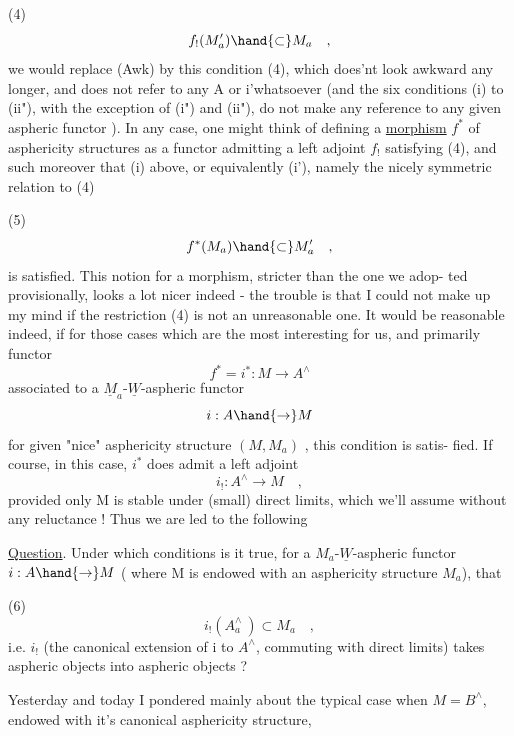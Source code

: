 
(4) \[ f_{!}(M'_a) \hand{\subset} M_a \quad , \]
we would replace (Awk) by this condition (4), which does'nt look awkward
any longer, and does not refer to any A or i'whatsoever (and 
the  six conditions (i) to (ii"), with the exception of (i")
and (ii"), do not make any reference to any given aspheric functor ).
In any case, one might think of defining a \uline{morphism} $f^*$ of asphericity
structures as a functor admitting a left adjoint $f_{!}$ satisfying (4), and
such moreover that (i) above, or equivalently (i'), namely the nicely
symmetric relation to (4)

(5) \[ f^*(M_a) \hand{\subset} M'_a \quad , \]
is satisfied. This notion for a morphism, stricter than the one we adop-%
ted provisionally, looks a lot nicer indeed - the trouble is that I
could not make up my mind if the restriction (4) is not  an unreasonable
one. It would be reasonable indeed, if for those cases which are the most
interesting for us, and primarily  functor
\[ f^* = i^* : M \longrightarrow A^{\wedge} \]
associated to a $\underline{M}_a$-$\underline{W}$-aspheric functor
\[ i: A \hand{\to} M \]
for   given "nice" asphericity structure $(M,M_a)$ , this condition is satis-%
fied. If course, in this case, $i^*$ does admit a left adjoint
\[ i_{!} : A^{\wedge} \longrightarrow M \quad , \]
provided only M is stable under (small) direct limits, which we'll assume
without any reluctance ! Thus we are led to the following

\uline{Question}. Under which conditions is it true, for a $M_a$-$\underline{W}$-aspheric
functor $i: A \hand{\to} M$ ( where M is endowed with an asphericity structure $M_a$),
that

(6) \[ i_{!}(A^{\wedge}_a \ ) \subset M_a \quad , \]
i.e. $i_{!}$ (the canonical extension of i to $A^{\wedge}$, commuting with direct
limits) takes aspheric objects into aspheric objects ?

 Yesterday and today I pondered mainly about the typical
case when $M = B^{\wedge}$, endowed with it's canonical asphericity structure,

